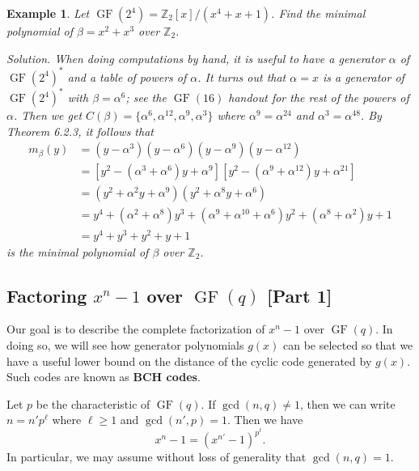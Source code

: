 \documentclass[10pt]{article}
\newcommand{\Z}{\mathbb{Z}}
\DeclareMathOperator{\GF}{GF}
\theoremstyle{newstyle}
\newtheorem{exmp}[thm]{Example}
\begin{document}
\begin{exmp}
Let $\GF(2^4) = \Z_2[x]/(x^4+x+1)$. Find the minimal polynomial of $\beta = x^2 + x^3$ over 
$\Z_2$. 

{\sc Solution.} When doing computations by hand, it is useful to have a generator $\alpha$ 
of $\GF(2^4)^*$ and a table of powers of $\alpha$. It turns out that $\alpha = x$ is a 
generator of $\GF(2^4)^*$ with $\beta = \alpha^6$; see the $\GF(16)$ handout for the rest of 
the powers of $\alpha$. Then we get $C(\beta) = \{\alpha^6, \alpha^{12}, \alpha^9, 
\alpha^3\}$ where $\alpha^9 = \alpha^{24}$ and $\alpha^3 = \alpha^{48}$. 
By Theorem 6.2.3, it follows that 
\begin{align*}
    m_\beta(y) 
    &= (y - \alpha^3)(y - \alpha^6)(y-\alpha^9)(y-\alpha^{12}) \\
    &= [y^2 - (\alpha^3+\alpha^6)y + \alpha^9][y^2 - (\alpha^9 + \alpha^{12})y + \alpha^{21}] \\
    &= (y^2 + \alpha^2y + \alpha^9)(y^2 + \alpha^8y + \alpha^6) \\
    &= y^4 + (\alpha^2 + \alpha^8)y^3 + (\alpha^9 + \alpha^{10} + \alpha^6) y^2 
    + (\alpha^8 + \alpha^2)y + 1 \\
    &= y^4 + y^3 + y^2 + y + 1
\end{align*}
is the minimal polynomial of $\beta$ over $\Z_2$. 
\end{exmp}

\subsection{Factoring $x^n-1$ over $\GF(q)$ [Part 1]}

Our goal is to describe the complete factorization of $x^n - 1$ 
over $\GF(q)$. 
In doing so, we will see how generator polynomials $g(x)$ can be selected so that we have a 
useful lower bound on the distance of the cyclic code generated by $g(x)$. Such codes are known 
as {\bf BCH codes}. 

Let $p$ be the characteristic of $\GF(q)$. If $\gcd(n, q) \neq 1$, then we can write $n = n'p^\ell$ 
where $\ell \geq 1$ and $\gcd(n', p) = 1$. Then we have 
\[ x^n - 1 = (x^{n'} - 1)^{p^\ell}. \] 
In particular, we may assume without loss of generality that $\gcd(n, q) = 1$. 
\end{document}
